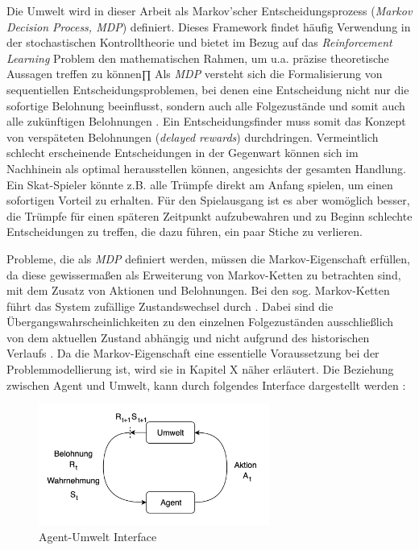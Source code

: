 \par 
Die Umwelt wird in dieser Arbeit als Markov'scher Entscheidungsprozess (\textit{Markov Decision Process, MDP}) definiert. Dieses Framework findet häufig Verwendung in der stochastischen Kontrolltheorie \cite[S.~3]{Gosavi} und bietet im Bezug auf das \textit{Reinforcement Learning} Problem den mathematischen Rahmen, um u.a. präzise theoretische Aussagen treffen zu können∏ Als \textit{MDP} versteht sich die Formalisierung von sequentiellen Entscheidungsproblemen, bei denen eine Entscheidung nicht nur die sofortige Belohnung beeinflusst, sondern auch alle Folgezustände und somit auch alle zukünftigen Belohnungen \cite[S.~47]{Sutton1998}. Ein Entscheidungsfinder muss somit das Konzept von verspäteten Belohnungen (\textit{delayed rewards}) durchdringen. Vermeintlich schlecht erscheinende Entscheidungen in der Gegenwart können sich im Nachhinein als optimal herausstellen können, angesichts der gesamten Handlung. Ein Skat-Spieler könnte z.B. alle Trümpfe direkt am Anfang spielen, um einen sofortigen Vorteil zu erhalten. Für den Spielausgang ist es aber womöglich besser, die Trümpfe für einen späteren Zeitpunkt aufzubewahren und zu Beginn \glqq schlechte \grqq{} Entscheidungen zu treffen, die dazu führen, ein paar Stiche zu verlieren.
\par 
Probleme, die als \textit{MDP} definiert werden, müssen die Markov-Eigenschaft erfüllen, da diese gewissermaßen als Erweiterung von Markov-Ketten zu betrachten sind, mit dem Zusatz von Aktionen und Belohnungen. Bei den sog. Markov-Ketten führt das System zufällige Zustandswechsel durch \cite[S.~3]{Gosavi}. Dabei sind die Übergangswahrscheinlichkeiten zu den einzelnen Folgezuständen ausschließlich von dem aktuellen Zustand abhängig und nicht aufgrund des historischen Verlaufs \cite[S.~3]{Gosavi}. Da die Markov-Eigenschaft eine essentielle Voraussetzung bei der Problemmodellierung ist, wird sie in Kapitel X näher erläutert. Die Beziehung zwischen Agent und Umwelt, kann durch folgendes Interface dargestellt werden \cite[S.~48]{Sutton1998}:

\par 

\begin{figure}[H]
    \centering
    \includegraphics[height=150px]{images/agentUmweltInterface.png}
    \caption{Agent-Umwelt Interface}
\end{figure}


